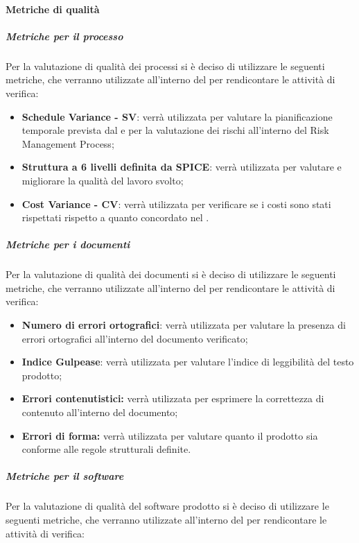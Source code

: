 		\paragraph{Metriche di qualità}
		\subparagraph{Metriche per il processo}
	Per la valutazione di qualità dei processi si è deciso di utilizzare le seguenti metriche, che verranno utilizzate all'interno del \PdQ{} per rendicontare le attività di verifica:
	\begin{itemize}
		\item \textbf{Schedule Variance - SV}: verrà utilizzata per valutare la pianificazione temporale prevista dal \PdP{} e per la valutazione dei rischi all'interno del Risk Management Process;
		\item \textbf{Struttura a 6 livelli definita da SPICE}: verrà utilizzata per valutare e migliorare la qualità del lavoro svolto;
		\item \textbf{Cost Variance - CV}: verrà utilizzata per verificare se i costi sono stati rispettati rispetto a quanto concordato nel \PdP{}.
	\end{itemize}
	\subparagraph{Metriche per i documenti}
	Per la valutazione di qualità dei documenti si è deciso di utilizzare le seguenti metriche, che verranno utilizzate all'interno del \PdQ{} per rendicontare le attività di verifica:
	\begin{itemize}
		\item \textbf{Numero di errori ortografici}: verrà utilizzata per valutare la presenza di errori ortografici all'interno del documento verificato;
		\item \textbf{Indice Gulpease}: verrà utilizzata per valutare l'indice di leggibilità del testo prodotto;
		\item \textbf{Errori contenutistici:} verrà utilizzata per esprimere la correttezza di contenuto all'interno del documento;
		\item \textbf{Errori di forma:} verrà utilizzata per valutare quanto il prodotto sia conforme alle regole strutturali definite.
	\end{itemize}
	\subparagraph{Metriche per il software}
	Per la valutazione di qualità del software prodotto si è deciso di utilizzare le seguenti metriche, che verranno utilizzate all'interno del \PdQ{} per rendicontare le attività di verifica:
